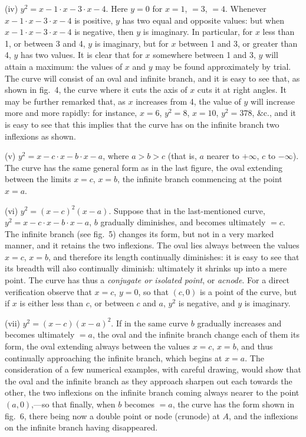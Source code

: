 \documentclass[11pt,a4paper]{book}
\begin{document}
(iv) $y^{2} = x - 1 \cdot x - 3 \cdot x - 4$. Here $y = 0$ for $x = 1$, $= 3$, $= 4$. Whenever $x - 1 \cdot x - 3 \cdot x - 4$ is positive, $y$ has two equal and opposite values: but when $x - 1 \cdot x - 3 \cdot x - 4$ is negative, then $y$ is imaginary. In particular, for $x$ less than 1, or between 3 and 4, $y$ is imaginary, but for $x$ between 1 and 3, or greater than 4, $y$ has two values. It is clear that for $x$ somewhere between 1 and 3, $y$ will attain a maximum: the values of $x$ and $y$ may be found approximately by trial. The curve will consist of an oval and infinite branch, and it is easy to see that, as shown in fig.~4, the curve where it cuts the axis of $x$ cuts it at right angles. It may be further remarked that, as $x$ increases from 4, the value of $y$ will increase more and more rapidly: for instance, $x = 6$, $y^{2} = 8$, $x = 10$, $y^{2} = 378$, \&c., and it is easy to see that this implies that the curve has on the infinite branch two inflexions as shown.

(v) $y^{2} = x - c \cdot x - b \cdot x - a$, where $a > b > c$ (that is, $a$ nearer to $+\infty$, $c$ to $-\infty$). The curve has the same general form as in the last figure, the oval extending between the limits $x = c$, $x = b$, the infinite branch commencing at the point $x = a$.

(vi) $y^{2} = (x - c)^{2}(x - a)$. Suppose that in the last-mentioned curve, $y^{2} = x - c \cdot x - b \cdot x - a$, $b$ gradually diminishes, and becomes ultimately $= c$. The infinite branch (see fig.~5) changes its form, but not in a very marked manner, and it retains the two inflexions. The oval lies always between the values $x = c$, $x = b$, and therefore its length continually diminishes: it is easy to see that its breadth will also continually diminish: ultimately it shrinks up into a mere point. The curve has thus a \textit{conjugate or isolated point}, or \textit{acnode}. For a direct verification observe that $x = c$, $y = 0$, so that $(c, 0)$ is a point of the curve, but if $x$ is either less than $c$, or between $c$ and $a$, $y^{2}$ is negative, and $y$ is imaginary.

(vii) $y^{2} = (x - c)(x - a)^{2}$. If in the same curve $b$ gradually increases and becomes ultimately $= a$, the oval and the infinite branch change each of them its form, the oval extending always between the values $x = c$, $x = b$, and thus continually approaching the infinite branch, which begins at $x = a$. The consideration of a few numerical examples, with careful drawing, would show that the oval and the infinite branch as they approach sharpen out each towards the other, the two inflexions on the infinite branch coming always nearer to the point $(a, 0)$,---so that finally, when $b$ becomes $= a$, the curve has the form shown in fig.~6, there being now a double point or node (crunode) at $A$, and the inflexions on the infinite branch having disappeared.
\end{document}
